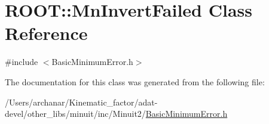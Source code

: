 \hypertarget{classROOT_1_1Minuit2_1_1BasicMinimumError_1_1MnInvertFailed}{}\section{R\+O\+OT\+:\+:Mn\+Invert\+Failed Class Reference}
\label{classROOT_1_1Minuit2_1_1BasicMinimumError_1_1MnInvertFailed}


{\ttfamily \#include $<$Basic\+Minimum\+Error.\+h$>$}



The documentation for this class was generated from the following file\+:\begin{DoxyCompactItemize}
\item 
/\+Users/archanar/\+Kinematic\+\_\+factor/adat-\/devel/other\+\_\+libs/minuit/inc/\+Minuit2/\mbox{\hyperlink{adat-devel_2other__libs_2minuit_2inc_2Minuit2_2BasicMinimumError_8h}{Basic\+Minimum\+Error.\+h}}\end{DoxyCompactItemize}
